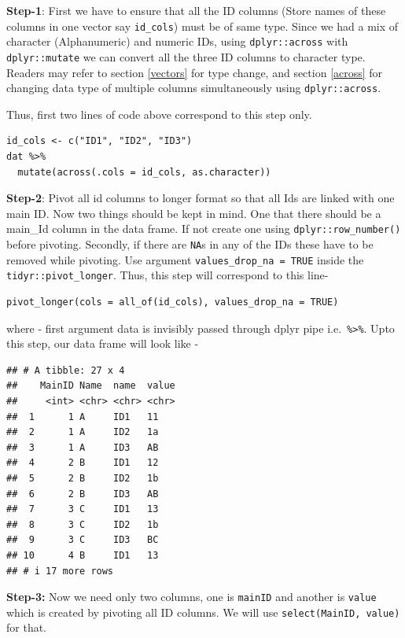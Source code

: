 \documentclass[
]{book}
\begin{document}
\textbf{Step-1}: First we have to ensure that all the ID columns (Store names of these columns in one vector say \texttt{id\_cols}) must be of same type. Since we had a mix of character (Alphanumeric) and numeric IDs, using \texttt{dplyr::across} with \texttt{dplyr::mutate} we can convert all the three ID columns to character type. Readers may refer to section \ref{vectors} for type change, and section \ref{across} for changing data type of multiple columns simultaneously using \texttt{dplyr::across}.

Thus, first two lines of code above correspond to this step only.

\begin{verbatim}
id_cols <- c("ID1", "ID2", "ID3")
dat %>%
  mutate(across(.cols = id_cols, as.character))
\end{verbatim}

\textbf{Step-2}: Pivot all id columns to longer format so that all Ids are linked with one main ID. Now two things should be kept in mind. One that there should be a main\_Id column in the data frame. If not create one using \texttt{dplyr::row\_number()} before pivoting. Secondly, if there are \texttt{NA}s in any of the IDs these have to be removed while pivoting. Use argument \texttt{values\_drop\_na\ =\ TRUE} inside the \texttt{tidyr::pivot\_longer}. Thus, this step will correspond to this line-

\begin{verbatim}
pivot_longer(cols = all_of(id_cols), values_drop_na = TRUE)
\end{verbatim}

where - first argument data is invisibly passed through dplyr pipe i.e.~\texttt{\%\textgreater{}\%}. Upto this step, our data frame will look like -

\begin{verbatim}
## # A tibble: 27 x 4
##    MainID Name  name  value
##     <int> <chr> <chr> <chr>
##  1      1 A     ID1   11   
##  2      1 A     ID2   1a   
##  3      1 A     ID3   AB   
##  4      2 B     ID1   12   
##  5      2 B     ID2   1b   
##  6      2 B     ID3   AB   
##  7      3 C     ID1   13   
##  8      3 C     ID2   1b   
##  9      3 C     ID3   BC   
## 10      4 B     ID1   13   
## # i 17 more rows
\end{verbatim}

\textbf{Step-3:} Now we need only two columns, one is \texttt{mainID} and another is \texttt{value} which is created by pivoting all ID columns. We will use \texttt{select(MainID,\ value)} for that.
\end{document}
